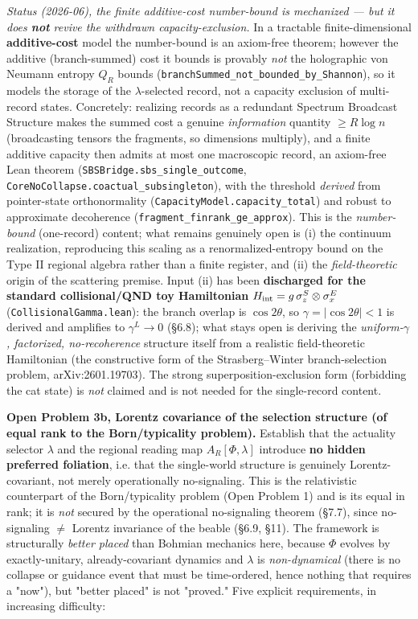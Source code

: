 \documentclass[11pt,a4paper]{article}
\begin{document}
\emph{Status (2026-06), the finite additive-cost number-bound is mechanized — but it does \textbf{not} revive the withdrawn capacity-exclusion.} In a tractable finite-dimensional \textbf{additive-cost} model the number-bound is an axiom-free theorem; however the additive (branch-summed) cost it bounds is provably \emph{not} the holographic von Neumann entropy $Q_R$ bounds (\texttt{branchSummed\_not\_bounded\_by\_Shannon}), so it models the storage of the $\lambda$-selected record, not a capacity exclusion of multi-record states. Concretely: realizing records as a redundant Spectrum Broadcast Structure makes the summed cost a genuine \emph{information} quantity $\ge R\log n$ (broadcasting tensors the fragments, so dimensions multiply), and a finite additive capacity then admits at most one macroscopic record, an axiom-free Lean theorem (\texttt{SBSBridge.sbs\_single\_outcome}, \texttt{CoreNoCollapse.coactual\_subsingleton}), with the threshold \emph{derived} from pointer-state orthonormality (\texttt{CapacityModel.capacity\_total}) and robust to approximate decoherence (\texttt{fragment\_finrank\_ge\_approx}). This is the \emph{number-bound} (one-record) content; what remains genuinely open is (i) the continuum realization, reproducing this scaling as a renormalized-entropy bound on the Type II regional algebra rather than a finite register, and (ii) the \emph{field-theoretic} origin of the scattering premise. Input (ii) has been \textbf{discharged for the standard collisional/QND toy Hamiltonian} $H_{\rm int}=g\,\sigma_z^S\otimes\sigma_x^E$ (\texttt{CollisionalGamma.lean}): the branch overlap is $\cos 2\theta$, so $\gamma=|\cos 2\theta|<1$ is derived and amplifies to $\gamma^L\to0$ (§6.8); what stays open is deriving the \emph{uniform-$\gamma$, factorized, no-recoherence} structure itself from a realistic field-theoretic Hamiltonian (the constructive form of the Strasberg–Winter branch-selection problem, arXiv:2601.19703). The strong superposition-exclusion form (forbidding the cat state) is \emph{not} claimed and is not needed for the single-record content.

\textbf{Open Problem 3b, Lorentz covariance of the selection structure (of equal rank to the Born/typicality problem).}
Establish that the actuality selector $\lambda$ and the regional reading map $A_R[\Phi,\lambda]$ introduce \textbf{no hidden preferred foliation}, i.e. that the single-world structure is genuinely Lorentz-covariant, not merely operationally no-signaling. This is the relativistic counterpart of the Born/typicality problem (Open Problem 1) and is its equal in rank; it is \emph{not} secured by the operational no-signaling theorem (§7.7), since no-signaling $\neq$ Lorentz invariance of the beable (§6.9, §11). The framework is structurally \emph{better placed} than Bohmian mechanics here, because $\Phi$ evolves by exactly-unitary, already-covariant dynamics and $\lambda$ is \emph{non-dynamical} (there is no collapse or guidance event that must be time-ordered, hence nothing that requires a "now"), but "better placed" is not "proved." Five explicit requirements, in increasing difficulty:
\end{document}
